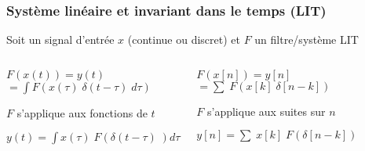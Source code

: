 \documentclass{beamer}
\begin{document}
\begin{frame} 
\frametitle{Système linéaire et invariant dans le temps (LIT) }
Soit un signal d'entrée $x$ (continue ou discret) et $F$ un filtre/système LIT\\
\vspace{1 cm}
\begin{columns}
\column{65mm}
\begin{center}
$F(x(t)) = y(t) $\\
$= \displaystyle \int F (x(\tau) \; \delta(t-\tau) \; d\tau)$\\
\vspace{0.5cm}

$F$ s'applique aux fonctions de $t$\\
\vspace{0.5cm}

$y(t) = \displaystyle \int x(\tau) \; F(\delta(t-\tau) \; )d\tau$\\
\vspace{0.5cm}

\end{center}

\column{55mm}
\begin{center}
$F(x[n]) = y[n] $\\
$ = \displaystyle \sum \; F( x[k] \; \delta[n-k]) $ \\
\vspace{0.5cm}

$F$ s'applique aux suites sur $n$\\
\vspace{0.5cm}

$ y[n] = \displaystyle \sum \; x[k] \;  F(\delta[n-k]) $ \\
\vspace{0.5cm}


\end{center}
\end{columns}
\end{frame}
\end{document}
